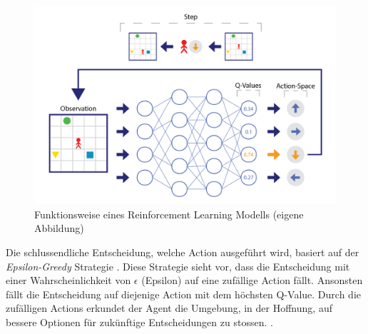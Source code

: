 \begin{figure}[!ht]
    \centering
    \includegraphics[width=\textwidth-1cm]{images/theorie/reinforce-1.png}
    \caption{Funktionsweise eines Reinforcement Learning Modells (eigene Abbildung)}\label{fig:reinforce-1}
 \end{figure}

Die schlussendliche
Entscheidung, welche Action ausgeführt wird, basiert auf der
\emph{Epsilon-Greedy} Strategie \cite[S. 34]{sutton_reinforcement_2014}. Diese
Strategie sieht vor, dass die Entscheidung mit einer Wahrscheinlichkeit von
$\epsilon$ (Epsilon) auf eine zufällige Action fällt. Ansonsten fällt die
Entscheidung auf diejenige Action mit dem höchsten Q-Value. Durch die zufälligen
Actions erkundet der Agent die Umgebung, in der Hoffnung, auf bessere Optionen
für zukünftige Entscheidungen zu stossen.
\cite{rajendra_koppula_exploration_nodate}.
 
